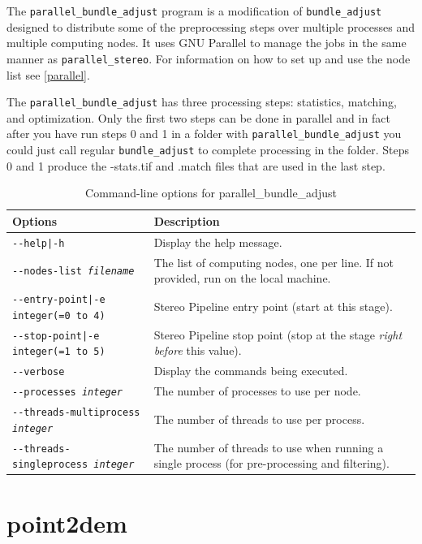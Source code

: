 The \texttt{parallel\_bundle\_adjust} program is a modification of
\texttt{bundle\_adjust} designed to distribute some of the preprocessing steps
over multiple processes and multiple computing nodes. It uses GNU Parallel 
to manage the jobs in the same manner as \texttt{parallel\_stereo}. For information
on how to set up and use the node list see \ref{parallel}.

The \texttt{parallel\_bundle\_adjust} has three processing steps: statistics,
matching, and optimization.  Only the first two steps can be done in parallel
and in fact after you have run steps 0 and 1 in a folder with 
\texttt{parallel\_bundle\_adjust} you could just call regular \texttt{bundle\_adjust}
to complete processing in the folder.  Steps 0 and 1 produce the -stats.tif and .match
files that are used in the last step.

\begin{longtable}{|l|p{7.5cm}|}
\caption{Command-line options for parallel\_bundle\_adjust}
\label{tbl:parallelbundleadjust}
\endfirsthead
\endhead
\endfoot
\endlastfoot
\hline
Options & Description \\ \hline \hline
\texttt{-\/-help|-h} & Display the help message.\\ \hline
\texttt{-\/-nodes-list \textit{filename} } & The list of computing nodes,
one per line. If not provided, run on the local machine. \\ \hline
\texttt{-\/-entry-point|-e integer(=0 to 4)} & Stereo Pipeline entry
point (start at this stage). \\ \hline
\texttt{-\/-stop-point|-e integer(=1 to 5)} & Stereo Pipeline stop point
(stop at the stage {\it right before} this value). \\ \hline
\texttt{-\/-verbose } & Display the commands being executed. \\ \hline
\texttt{-\/-processes \textit{integer}} & The number of processes to use per node. \\ \hline
\texttt{-\/-threads-multiprocess \textit{integer}} & The number of threads to use per process.\\ \hline
\texttt{-\/-threads-singleprocess \textit{integer}} & The number of threads to use when running a single process (for pre-processing and filtering).\\ \hline
\end{longtable}

\section{point2dem}
\label{point2dem}

